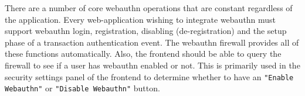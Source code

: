 There are a number of core webauthn operations that are constant regardless of the application. Every web-application wishing to integrate webauthn must support webauthn login, registration, disabling (de-registration) and the setup phase of a transaction authentication event. The webauthn firewall provides all of these functions automatically. Also, the frontend should be able to query the firewall to see if a user has webauthn enabled or not. This is primarily used in the security settings panel of the frontend to determine whether to  have an \lstinline{"Enable Webauthn"} or \lstinline{"Disable Webauthn"} button.











